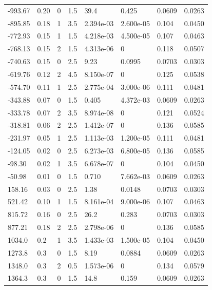 \documentclass[preview]{standalone}
\begin{document}
{{\begin{tabular}{L{1.2cm}C{1.2cm} C{0.3cm}C{0.5cm} C{1.4cm}C{1.4cm} C{1.4cm}C{1.4cm}}
  -993.67  &  0.20  & 0     & 1.5 &  39.4  & 0.425  & 0.0609 &  0.0263   \\ 
  -895.85  &  0.18  & 1     & 3.5 &  2.394e-03  & 2.600e-05  & 0.104 &  0.0450   \\ 
  -772.93  &  0.15  & 1     & 1.5 &  4.218e-03  & 4.500e-05  & 0.107 &  0.0463   \\ 
  -768.13  &  0.15  & 2     & 1.5 &  4.313e-06  & 0  & 0.118 &  0.0507   \\ 
  -740.63  &  0.15  & 0     & 2.5 &  9.23  & 0.0995  & 0.0703 &  0.0303   \\ 
  -619.76  &  0.12  & 2     & 4.5 &  8.150e-07  & 0  & 0.125 &  0.0538   \\ 
  -574.70  &  0.11  & 1     & 2.5 &  2.775e-04  & 3.000e-06  & 0.111 &  0.0481   \\ 
  -343.88  &  0.07  & 0     & 1.5 &  0.405  & 4.372e-03  & 0.0609 &  0.0263   \\ 
  -333.78  &  0.07  & 2     & 3.5 &  8.974e-08  & 0  & 0.121 &  0.0524   \\ 
  -318.81  &  0.06  & 2     & 2.5 &  1.412e-07  & 0  & 0.136 &  0.0585   \\ 
  -231.97  &  0.05  & 1     & 2.5 &  1.113e-03  & 1.200e-05  & 0.111 &  0.0481   \\ 
  -124.05  &  0.02  & 0     & 2.5 &  6.273e-03  & 6.800e-05  & 0.136 &  0.0585   \\ 
  -98.30  &  0.02  & 1     & 3.5 &  6.678e-07  & 0  & 0.104 &  0.0450   \\ 
  -50.98  &  0.01  & 0     & 1.5 &  0.710  & 7.662e-03  & 0.0609 &  0.0263   \\ 
  158.16  &  0.03  & 0     & 2.5 &  1.38  & 0.0148  & 0.0703 &  0.0303   \\ 
  521.42  &  0.10  & 1     & 1.5 &  8.161e-04  & 9.000e-06  & 0.107 &  0.0463   \\ 
  815.72  &  0.16  & 0     & 2.5 &  26.2  & 0.283  & 0.0703 &  0.0303   \\ 
  877.21  &  0.18  & 2     & 2.5 &  2.798e-06  & 0  & 0.136 &  0.0585   \\ 
  1034.0  &   0.2  & 1     & 3.5 &  1.433e-03  & 1.500e-05  & 0.104 &  0.0450   \\ 
  1273.8  &   0.3  & 0     & 1.5 &  8.19  & 0.0884  & 0.0609 &  0.0263   \\ 
  1348.0  &   0.3  & 2     & 0.5 &  1.573e-06  & 0  & 0.134 &  0.0579   \\ 
  1364.3  &   0.3  & 0     & 1.5 &  14.8  & 0.159  & 0.0609 &  0.0263   \\ 

\end{tabular}}}
\end{document}
